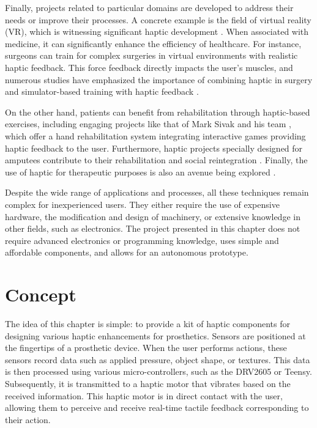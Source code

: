 Finally, projects related to particular domains are developed to address their needs or improve their processes. A concrete example is the field of virtual reality (VR), which is witnessing significant haptic development \cite{leleve_haptic_2020}. When associated with medicine, it can significantly enhance the efficiency of healthcare. For instance, surgeons can train for complex surgeries in virtual environments with realistic haptic feedback. This force feedback directly impacts the user's muscles, and numerous studies have emphasized the importance of combining haptic in surgery and simulator-based training with haptic feedback \cite{noauthor_role_nodate}\cite{willis_virtual_2014}\cite{correa_haptic_2019}\cite{escobar-castillejos_review_2016-1}\cite{singapogu_perspective_2014}\cite{kunkler_role_2006}.

On the other hand, patients can benefit from rehabilitation through haptic-based exercises, including engaging projects like that of Mark Sivak and his team \cite{noauthor_haptic_nodate}, which offer a hand rehabilitation system integrating interactive games providing haptic feedback to the user. Furthermore, haptic projects specially designed for amputees contribute to their rehabilitation and social reintegration \cite{noauthor_pilot_nodate}. Finally, the use of haptic for therapeutic purposes is also an avenue being explored \cite{vaucelle_design_2009}.

Despite the wide range of applications and processes, all these techniques remain complex for inexperienced users. They either require the use of expensive hardware, the modification and design of machinery, or extensive knowledge in other fields, such as electronics. The project presented in this chapter does not require advanced electronics or programming knowledge, uses simple and affordable components, and allows for an autonomous prototype.

\section{Concept}
The idea of this chapter is simple: to provide a kit of haptic components for designing various haptic enhancements for prosthetics. Sensors are positioned at the fingertips of a prosthetic device. When the user performs actions, these sensors record data such as applied pressure, object shape, or textures. This data is then processed using various micro-controllers, such as the DRV2605 or Teensy. Subsequently, it is transmitted to a haptic motor that vibrates based on the received information. This haptic motor is in direct contact with the user, allowing them to perceive and receive real-time tactile feedback corresponding to their action.

